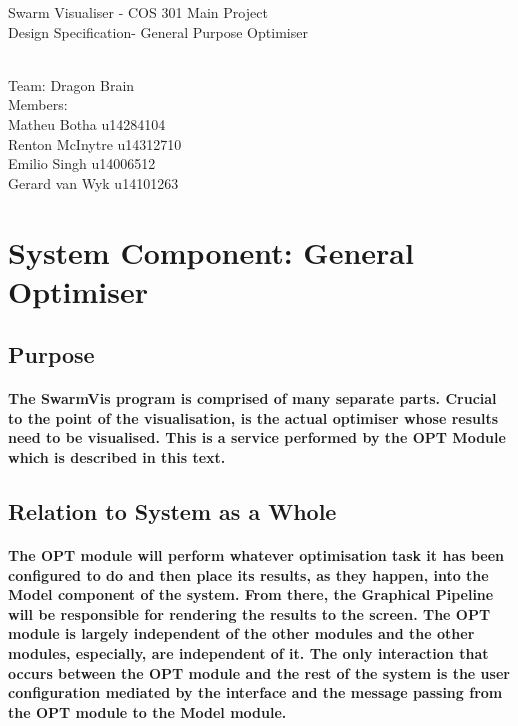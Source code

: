 \documentclass[11pt]{article}
\begin{document}
\begin{titlepage}

\begin{center}
\begin{huge}
Swarm Visualiser - COS 301 Main Project
\\
Design Specification- General Purpose Optimiser
\begin{small}
\\
Team: Dragon Brain
\\
Members:
\\
Matheu Botha u14284104
\\
Renton McInytre u14312710
\\
Emilio Singh u14006512
\\
Gerard van Wyk u14101263

\end{small}

\end{huge}
\end{center}
\end{titlepage}

\pagebreak

\tableofcontents
\pagebreak
\section{System Component: General Optimiser}
\subsection{Purpose}
\paragraph{The SwarmVis program is comprised of many separate parts. Crucial to the point of the visualisation, is the actual optimiser whose results need to be visualised. This is a service performed by the OPT Module which is described in this text.}

\subsection{Relation to System as a Whole}
\paragraph{The OPT module will perform whatever optimisation task it has been configured to do and then place its results, as they happen, into the Model component of the system. From there, the Graphical Pipeline will be responsible for rendering the results to the screen. The OPT module is largely independent of the other modules and the other modules, especially, are independent of it. The only interaction that occurs between the OPT module and the rest of the system is the user configuration mediated by the interface and the message passing from the OPT module to the Model module.
}
\end{document}
